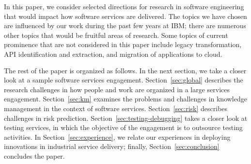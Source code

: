 
In this paper, we consider selected directions for research in software
engineering that would impact how software services are delivered.  The topics
we have chosen are influenced by our work during the past few years at IBM;
there are numerous other topics that would be fruitful areas of research.  Some
topics of current prominence that are not considered in this paper include
legacy transformation, API identification and extraction, and migration of
applications to cloud.


The rest of the paper is organized as follows. In the next section, we take a
closer look at a sample software services engagement.  Section~\ref{sec:global}
describes the research challenges in how people and work are organized in a
large services engagement.  Section~\ref{sec:km} examines the problems and
challenges in knowledge management in the context of software services.
Section~\ref{sec:risk} describes challenges in risk prediction.
Section~\ref{sec:testing-debugging} takes a closer look at testing services, in
which the objective of the engagement is to outsource testing activities.  In
Section~\ref{sec:experience}, we relate our experiences in deploying innovations
in industrial service delivery; finally, Section~\ref{sec:conclusion} concludes
the paper.

